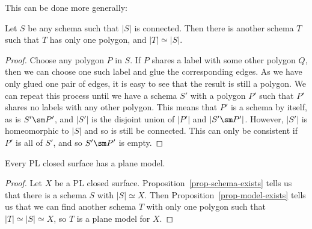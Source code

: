 This can be done more generally:
\begin{proposition}\label{prop-model-exists}
 Let $S$ be any schema such that $|S|$ is connected.  Then there is
 another schema $T$ such that $T$ has only one polygon, and
 $|T|\simeq |S|$.
\end{proposition}
\begin{proof}
 Choose any polygon $P$ in $S$.  If $P$ shares a label with some other
 polygon $Q$, then we can choose one such label and glue the
 corresponding edges.  As we have only glued one pair of edges, it is
 easy to see that the result is still a polygon.  We can repeat this
 process until we have a schema $S'$ with a polygon $P'$ such that
 $P'$ shares no labels with any other polygon.  This means that $P'$
 is a schema by itself, as is $S'\sm P'$, and $|S'|$ is the disjoint
 union of $|P'|$ and $|S'\sm P'|$.  However, $|S'|$ is homeomorphic to
 $|S|$ and so is still be connected.  This can only be consistent if
 $P'$ is all of $S'$, and so $S'\sm P'$ is empty.
\end{proof}

\begin{corollary}
 Every PL closed surface has a plane model.
\end{corollary}
\begin{proof}
 Let $X$ be a PL closed surface.  Proposition~\ref{prop-schema-exists}
 tells us that there is a schema $S$ with $|S|\simeq X$.  Then 
 Proposition~\ref{prop-model-exists} tells us that we can find another
 schema $T$ with only one polygon such that $|T|\simeq |S|\simeq X$,
 so $T$ is a plane model for $X$.
\end{proof}


